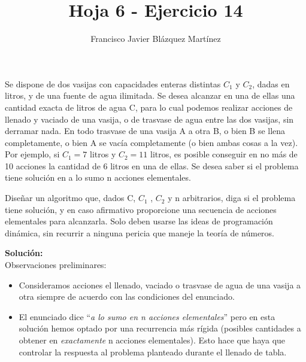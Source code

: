 \documentclass[12pt]{article}
\newenvironment{problem}[2][Problema]{\begin{trivlist}
\item[\hskip \labelsep {\bfseries #1}\hskip \labelsep {\bfseries #2.}]}{\end{trivlist}}
\begin{document}
\title{\textbf{Hoja 6 - Ejercicio 14}}
\author{Francisco Javier Blázquez Martínez}
\date{}
\maketitle
 
\begin{problem}{6.14}
Se dispone de dos vasijas con capacidades enteras distintas $C_1$ y $C_2$, dadas en 
litros, y de una fuente de agua ilimitada. Se desea alcanzar en una de ellas una 
cantidad exacta de litros de agua C, para lo cual podemos realizar acciones de llenado 
y vaciado de una vasija, o de trasvase de agua entre las dos vasijas, sin derramar nada. 
En todo trasvase de una vasija A a otra B, o bien B se llena completamente, o bien A se 
vacía completamente (o bien ambas cosas a la vez). Por ejemplo, si $C_1 = 7$ litros y 
$C_2 = 11$ litros, es posible conseguir en no más de 10 acciones la cantidad de 6 litros
en una de ellas. Se desea saber si el problema tiene solución en a lo sumo n acciones 
elementales.

Diseñar un algoritmo que, dados C, $C_1$ , $C_2$ y n arbitrarios, diga si el problema 
tiene solución, y en caso afirmativo proporcione una secuencia de acciones elementales 
para alcanzarla. Solo deben usarse las ideas de programación dinámica, sin recurrir a 
ninguna pericia que maneje la teoría de números.
\end{problem}


\textbf{Solución:} \\


\setlength{\parskip}{0mm}
Observaciones preliminares:

\begin{itemize}
    \item Consideramos acciones el llenado, vaciado o trasvase de agua de una vasija a 
          otra siempre de acuerdo con las condiciones del enunciado.
    \item El enunciado dice ``\textit{a lo sumo en n acciones elementales}'' pero en esta
          solución hemos optado por una recurrencia más rígida (posibles cantidades a 
          obtener en \textit{exactamente} n acciones elementales). Esto hace que haya que
          controlar la respuesta al problema planteado durante el llenado de tabla.
\end{itemize}
\end{document}
